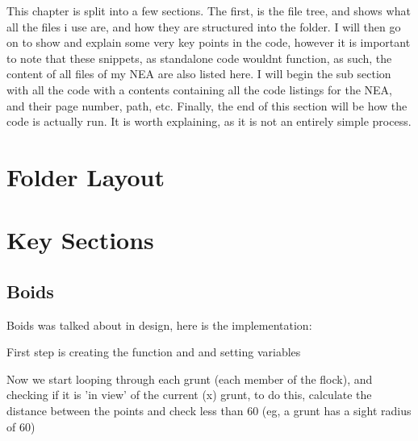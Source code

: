 This chapter is split into a few sections. The first, is the file tree, and shows what all the files i use are, and how they are structured into the folder. I will then go on to show and explain some very key points in the code, however it is important to note that these snippets, as standalone code wouldnt function, as such, the content of all files of my NEA are also listed here. I will begin the sub section with all the code with a contents containing all the code listings for the NEA, and their page number, path, etc. Finally, the end of this section will be how the code is actually run. It is worth explaining, as it is not an entirely simple process.

\section{Folder Layout}

\section{Key Sections}
\subsection{Boids}
Boids was talked about in design, here is the implementation:

First step is creating the function and and setting variables


Now we start looping through each grunt (each member of the flock), and checking if it is 'in view' of the current (x) grunt, to do this, calculate the distance between the points and check less than 60 (eg, a grunt has a sight radius of 60) 


